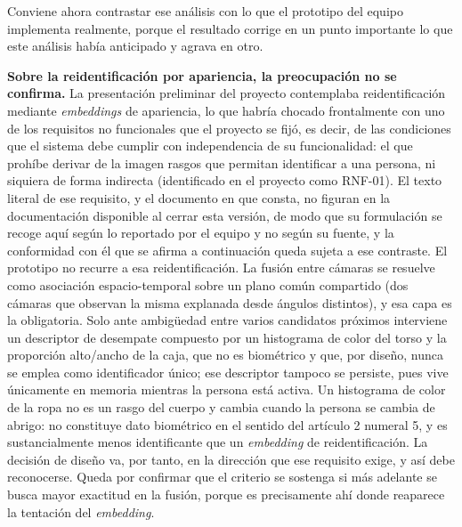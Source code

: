Conviene ahora contrastar ese análisis con lo que el prototipo del
equipo implementa realmente, porque el resultado corrige en un punto
importante lo que este análisis había anticipado y agrava en otro.

\textbf{Sobre la reidentificación por apariencia, la preocupación no se
confirma.} La presentación preliminar del proyecto contemplaba
reidentificación mediante \emph{embeddings} de apariencia, lo que habría
chocado frontalmente con uno de los requisitos no funcionales que el
proyecto se fijó, es decir, de las condiciones que el sistema debe
cumplir con independencia de su funcionalidad: el que prohíbe derivar de
la imagen rasgos que permitan identificar a una persona, ni siquiera de
forma indirecta (identificado en el proyecto como RNF-01). El texto
literal de ese requisito, y el documento en que consta, no figuran en la
documentación disponible al cerrar esta versión, de modo que su
formulación se recoge aquí según lo reportado por el equipo y no según
su fuente, y la conformidad con él que se afirma a continuación queda
sujeta a ese contraste. El prototipo no recurre a esa reidentificación.
La fusión entre cámaras se resuelve como asociación espacio-temporal
sobre un plano común compartido (dos cámaras que observan la misma
explanada desde ángulos distintos), y esa capa es la obligatoria. Solo
ante ambigüedad entre varios candidatos próximos interviene un
descriptor de desempate compuesto por un histograma de color del torso y
la proporción alto/ancho de la caja, que no es biométrico y que, por
diseño, nunca se emplea como identificador único; ese descriptor tampoco
se persiste, pues vive únicamente en memoria mientras la persona está
activa. Un histograma de color de la ropa no es un rasgo del cuerpo y
cambia cuando la persona se cambia de abrigo: no constituye dato
biométrico en el sentido del artículo 2 numeral 5, y es sustancialmente
menos identificante que un \emph{embedding} de reidentificación. La
decisión de diseño va, por tanto, en la dirección que ese requisito
exige, y así debe reconocerse. Queda por confirmar que el criterio se
sostenga si más adelante se busca mayor exactitud en la fusión, porque
es precisamente ahí donde reaparece la tentación del \emph{embedding}.

